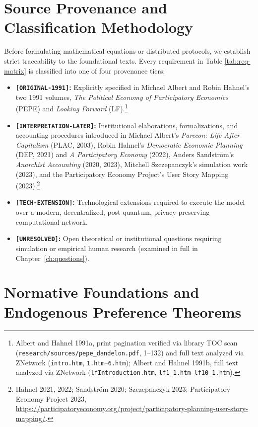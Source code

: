 \documentclass[10pt,twoside,openany]{book}
\theoremstyle{dpepstyle}
\begin{document}
\section{Source Provenance and Classification Methodology}

Before formulating mathematical equations or distributed protocols, we establish strict traceability to the foundational texts. Every requirement in Table \ref{tab:req-matrix} is classified into one of four provenance tiers:
\begin{itemize}[leftmargin=1.6em,itemsep=2pt]
  \item \textbf{\texttt{[ORIGINAL-1991]}:} Explicitly specified in Michael Albert and Robin Hahnel's two 1991 volumes, \emph{The Political Economy of Participatory Economics} (PEPE) and \emph{Looking Forward} (LF).\footnote{Albert and Hahnel 1991a, print pagination verified via library TOC scan (\texttt{research/sources/pepe\_dandelon.pdf}, 1--132) and full text analyzed via ZNetwork (\texttt{intro.htm}, \texttt{1.htm}--\texttt{6.htm}); Albert and Hahnel 1991b, full text analyzed via ZNetwork (\texttt{lfIntroduction.htm}, \texttt{lf1\_1.htm}--\texttt{lf10\_1.htm}).}
  \item \textbf{\texttt{[INTERPRETATION-LATER]}:} Institutional elaborations, formalizations, and accounting procedures introduced in Michael Albert's \emph{Parecon: Life After Capitalism} (PLAC, 2003), Robin Hahnel's \emph{Democratic Economic Planning} (DEP, 2021) and \emph{A Participatory Economy} (2022), Anders Sandstr\"om's \emph{Anarchist Accounting} (2020, 2023), Mitchell Szczepanczyk's simulation work (2023), and the Participatory Economy Project's User Story Mapping (2023).\footnote{Hahnel 2021, 2022; Sandstr\"om 2020; Szczepanczyk 2023; Participatory Economy Project 2023, \url{https://participatoryeconomy.org/project/participatory-planning-user-story-mapping/}.}
  \item \textbf{\texttt{[TECH-EXTENSION]}:} Technological extensions required to execute the model over a modern, decentralized, post-quantum, privacy-preserving computational network.
  \item \textbf{\texttt{[UNRESOLVED]}:} Open theoretical or institutional questions requiring simulation or empirical human research (examined in full in Chapter~\ref{ch:questions}).
\end{itemize}

\section{Normative Foundations and Endogenous Preference Theorems}
\label{sec:normative}
\end{document}
